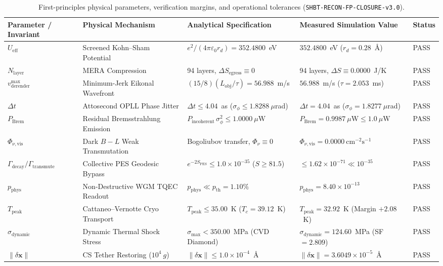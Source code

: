 \documentclass[11pt,onecolumn]{article}
\begin{document}
\begin{table}[!htbp]
\centering\small
\caption{First-principles physical parameters, verification margins, and operational tolerances (\texttt{SHBT-RECON-FP-CLOSURE-v3.0}).}
\label{tab:recon_fp_parameters}
\begin{tabularx}{\textwidth}{@{}l p{4.5cm} p{3.2cm} X l@{}}
\toprule
Parameter / Invariant & Physical Mechanism & Analytical Specification & Measured Simulation Value & Status \\
\midrule
$U_{\text{eff}}$ & Screened Kohn--Sham Potential & $e^2/(4\pi\varepsilon_0 r_d) = 352.4800$~eV & $352.4800$~eV ($r_d = 0.28$~\AA) & PASS \\
$N_{\text{layer}}$ & MERA Compression & 94 layers, $\Delta S_{\text{egress}} \equiv 0$ & 94 layers, $\Delta S \equiv 0.0000$~J/K & PASS \\
$v_{\text{derender}}^{\max}$ & Minimum-Jerk Eikonal Wavefront & $(15/8)(L_{\text{obj}}/\tau) = 56.988$~m/s & $56.988$~m/s ($\tau = 2.053$~ms) & PASS \\
$\Delta t$ & Attosecond OPLL Phase Jitter & $\Delta t \le 4.04$~as ($\sigma_\phi \le 1.8288~\mu$rad) & $\Delta t = 4.04$~as ($\sigma_\phi = 1.8277~\mu$rad) & PASS \\
$P_{\text{Brem}}$ & Residual Bremsstrahlung Emission & $P_{\text{incoherent}}\,\sigma_\phi^2 \le 1.0000~\mu\text{W}$ & $P_{\text{Brem}} = 0.9987~\mu\text{W} \le 1.0~\mu\text{W}$ & PASS \\
$\Phi_{\nu,\text{vis}}$ & Dark $B-L$ Weak Transmutation & Bogoliubov transfer, $\Phi_\nu \equiv 0$ & $\Phi_{\nu,\text{vis}} = 0.0000~\text{cm}^{-2}\text{s}^{-1}$ & PASS \\
$\Gamma_{\text{decay}}/\Gamma_{\text{transmute}}$ & Collective PES Geodesic Bypass & $e^{-2 S_{\text{PES}}} \le 1.0\times 10^{-35}$ ($S \ge 81.5$) & $\le 1.62\times 10^{-71} \ll 10^{-35}$ & PASS \\
$p_{\text{phys}}$ & Non-Destructive WGM TQEC Readout & $p_{\text{phys}} \ll p_{\text{th}} = 1.10\%$ & $p_{\text{phys}} = 8.40\times 10^{-13}$ & PASS \\
$T_{\text{peak}}$ & Cattaneo--Vernotte Cryo Transport & $T_{\text{peak}} \le 35.00$~K ($T_c = 39.12$~K) & $T_{\text{peak}} = 32.92$~K (Margin $+2.08$~K) & PASS \\
$\sigma_{\text{dynamic}}$ & Dynamic Thermal Shock Stress & $\sigma_{\max} < 350.00$~MPa (CVD Diamond) & $\sigma_{\text{dynamic}} = 124.60$~MPa (SF $= 2.809$) & PASS \\
$\|\delta\mathbf{x}\|$ & CS Tether Restoring ($10^4~g$) & $\|\delta\mathbf{x}\| \le 1.0\times 10^{-4}$~\AA & $\|\delta\mathbf{x}\| = 3.6049\times 10^{-5}$~\AA & PASS \\

\end{tabularx}
\end{table}
\end{document}
